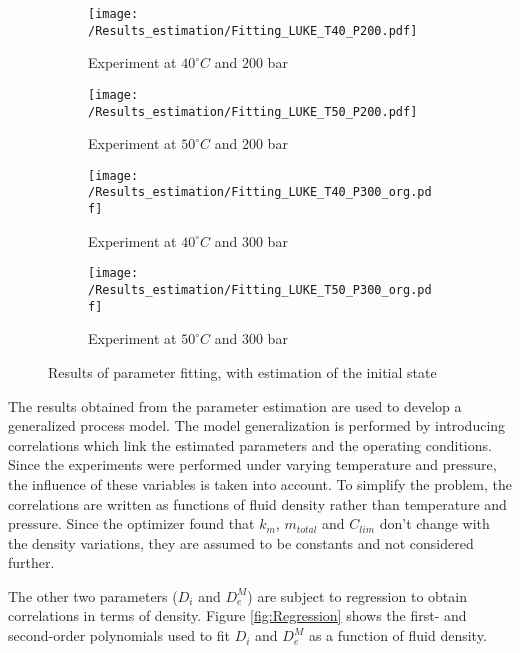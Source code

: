 \documentclass[../Article_Model_Parameters.tex]{subfiles}
\begin{document}
	\begin{figure}[!h]
		\centering
		\begin{subfigure}[b]{\columnwidth}
			\centering
			\texttt{[image: /Results\_estimation/Fitting\_LUKE\_T40\_P200.pdf]}
			\caption{Experiment at $40^\circ C$ and $200$ bar}
		\end{subfigure}
		\begin{subfigure}[b]{\columnwidth}
			\centering
			\texttt{[image: /Results\_estimation/Fitting\_LUKE\_T50\_P200.pdf]}
			\caption{Experiment at $50^\circ C$ and $200$ bar}
		\end{subfigure}
		\begin{subfigure}[b]{\columnwidth}
			\centering
			\texttt{[image: /Results\_estimation/Fitting\_LUKE\_T40\_P300\_org.pdf]}
			\caption{Experiment at $40^\circ C$ and $300$ bar}
		\end{subfigure}
		\begin{subfigure}[b]{\columnwidth}
			\centering
			\texttt{[image: /Results\_estimation/Fitting\_LUKE\_T50\_P300\_org.pdf]}
			\caption{Experiment at $50^\circ C$ and $300$ bar}
		\end{subfigure}
		\caption{Results of parameter fitting, with estimation of the initial state}
		\label{fig: estimation_results}
	\end{figure}

	The results obtained from the parameter estimation are used to develop a generalized process model. The model generalization is performed by introducing correlations which link the estimated parameters and the operating conditions. Since the experiments were performed under varying temperature and pressure, the influence of these variables is taken into account. To simplify the problem, the correlations are written as functions of fluid density rather than temperature and pressure. Since the optimizer found that $k_m$, $m_{total}$ and $C_{lim}$ don't change with the density variations, they are assumed to be constants and not considered further.
		
	The other two parameters ($D_i$ and $D_e^M$) are subject to regression to obtain correlations in terms of density. Figure \ref{fig:Regression} shows the first- and second-order polynomials used to fit $D_i$ and $D_e^M$ as a function of fluid density. 
	
\end{document}
